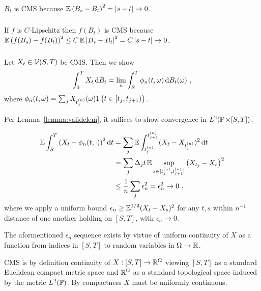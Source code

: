 \documentclass{article}
\begin{document}
        \subsubsection{}
        \(B_t\) is CMS because \(\E\pa{B_s-B_t}^2=\abs{s-t}\rightarrow 0\).
        \subsubsection{}
        If \(f\) is \(C\)-Lipschitz then \(f(B_t)\) is CMS because \(\E\pa{f(B_s)-f(B_t)}^2\le C\E\abs{B_s-B_t}^2=C\abs{s-t}\rightarrow 0\).
        \subsubsection{}
\label{ex3.13c}
        Let \(X_t\in \mcV(S, T)\) be CMS. Then we show
        \[
          \int_0^T X_t \d{B_t}=\lim_n\int_S^T\phi_n(t, \omega)\d{B_t(\omega)}\,\,,
        \]
        where \(\phi_n(t, \omega)=\sum_jX_{t_j^{(n)}}(\omega)1\ca{t\in[t_j,t_{j+1})}\).

        Per Lemma~\ref{lemma:validelem}, it suffices to show convergence in \(L^2(\P\times [S,T])\).


        \begin{align*}
          \E\int_S^T\pa{X_t-\phi_n(t,\cdot)}^2\d{t}
          &=\sum_j\E\int_{t_j^{(n)}}^{t_{j+1}^{(n)}}(X_t-X_{t_j^{(n)}})^2\d{t}\\
          &=\sum_j\Delta_jt\E\sup_{s\in[t_j^{(n)},t_{j+1}^{(n)}]}\pa{X_{t_j}-X_s}^2\\
          &\le\frac{1}{n}\sum_j \epsilon_n^2=\epsilon_n^2\rightarrow 0\,\,,
        \end{align*}
        where we apply a uniform bound \(\epsilon_n\ge \E^{1/2}(X_t-X_{s})^2\) for any \(t,s\) within \(n^{-1}\) distance of one another holding on \([S, T]\), with \(\epsilon_n\rightarrow 0\).

        The aformentioned \(\epsilon_n\) sequence exists by virtue of uniform continuity of \(X\) as a function from indices in \([S, T]\) to random variables in \(\Omega\rightarrow\R\).

        CMS is by definition continuity of \(X:[S,T]\rightarrow\R^{\Omega}\) viewing \([S, T]\) as a standard Euclidean compact metric space and \(\R^\Omega\) as a standard topological space induced by the metric \(L^2(\P)\). By compactness \(X\) must be uniformly continuous.


        \subsection{}
\end{document}
